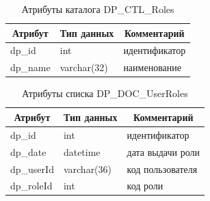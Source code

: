 \begin{table}[p]
    \centering\small

    \caption{Атрибуты каталога DP\_CTL\_Roles}
    \label{tab:DP_CTL_Roles}

    \begin{tabular}{|p{5cm}|p{2.5cm}|p{9cm}|}
        \hline
        \multicolumn{1}{|c|}{Атрибут}
        & \multicolumn{1}{c|}{Тип данных}
        & \multicolumn{1}{c|}{Комментарий}
        \\ \hline

        dp\_id & int & идентификатор \\ \hline
        dp\_name & varchar(32) & наименование \\ \hline
    \end{tabular}
\end{table}

\begin{table}[p]
    \centering\small

    \caption{Атрибуты списка DP\_DOC\_UserRoles}
    \label{tab:DP_DOC_UserRoles}

    \begin{tabular}{|p{5cm}|p{2.5cm}|p{9cm}|}
        \hline
        \multicolumn{1}{|c|}{Атрибут}
        & \multicolumn{1}{c|}{Тип данных}
        & \multicolumn{1}{c|}{Комментарий}
        \\ \hline

        dp\_id & int & идентификатор \\ \hline
        dp\_date & datetime & дата выдачи роли \\ \hline
        dp\_userId & varchar(36) & код пользователя \\ \hline
        dp\_roleId & int & код роли \\ \hline
    \end{tabular}
\end{table}

